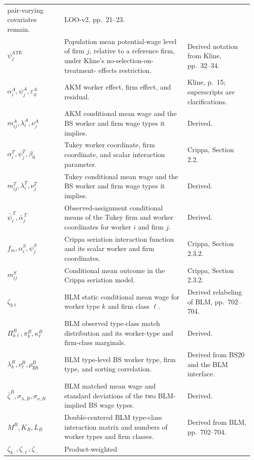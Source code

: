 \documentclass[11pt]{article}
\begin{document}
\begin{longtable}{p{}p{}p{}}
pair-varying covariates remain. & LOO-v2, pp.\ 21--23. \\
\(\psi_j^{\mathrm{ATE}}\) & Population mean potential-wage level of firm
\(j\), relative to a reference firm, under Kline's no-selection-on-treatment-
effects restriction. & Derived notation from Kline, pp.\ 32--34. \\
\(\alpha_i^A,\psi_j^A,\varepsilon_{it}^A\) & AKM worker effect, firm effect,
and residual. & Kline, p.\ 15; superscripts are clarifications. \\
\(m^A_{ij},\lambda_i^A,\nu_j^A\) & AKM conditional mean wage and the BS
worker and firm wage types it implies. & Derived. \\
\(\alpha_i^T,\psi_j^T,\beta_0\) & Tukey worker coordinate, firm coordinate,
and scalar interaction parameter. & Crippa, Section 2.2. \\
\(m^T_{ij},\lambda_i^T,\nu_j^T\) & Tukey conditional mean wage and the BS
worker and firm wage types it implies. & Derived. \\
\(\bar\psi_i^{\,T},\bar\alpha_j^{\,T}\) & Observed-assignment conditional
means of the Tukey firm and worker coordinates for worker \(i\) and firm
\(j\). & Derived. \\
\(f_m,\alpha_i^S,\psi_j^S\) & Crippa seriation interaction function and its
scalar worker and firm coordinates. & Crippa, Section 2.3.2. \\
\(m^S_{ij}\) & Conditional mean outcome in the Crippa seriation model. &
Crippa, Section 2.3.2. \\
\(\zeta_{k\ell}\) & BLM static conditional mean wage for worker type \(k\)
and firm class \(\ell\). & Derived relabeling of BLM, pp.\ 702--704. \\
\(\Pi^B_{k\ell},\pi_k^B,\kappa_\ell^B\) & BLM observed type-class match
distribution and its worker-type and firm-class marginals. & Derived. \\
\(\lambda_k^B,\nu_\ell^B,\rho_{\mathrm{BS}}^B\) & BLM type-level BS worker
type, firm type, and sorting correlation. & Derived from BS20 and the BLM
interface. \\
\(\bar\zeta^B,\sigma_{\lambda,B},\sigma_{\nu,B}\) & BLM matched mean wage and
standard deviations of the two BLM-implied BS wage types. & Derived. \\
\(M^B,K_B,L_B\) & Double-centered BLM type-class interaction matrix and
numbers of worker types and firm classes. & Derived from BLM,
pp.\ 702--704. \\
\(\zeta_{k\cdot},\zeta_{\cdot\ell},\zeta_{\cdot\cdot}\) & Product-weighted

\end{longtable}
\end{document}
